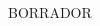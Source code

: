 \begin{titlepage}
    \vspace*{\fill}
    \begin{center}
        {\crest} \\[1.3cm]
        {\Large \gradua}\\[0.3cm]
        {\espezialitatea}\\[1.5cm]

        \HRule \\[0.5cm]
        {
        \LARGE
        \begin{spacing}{0.5}
        \textbf{\izenburua}
        \end{spacing}
        }
        \vspace{0.5cm}
        \HRule \\[0.5cm]

        {\large {\gapizenburua}}\\[2.0cm]

        {\egileatestua\\}
        {\textsl{\egilea}\\}
        \vspace{1.0cm}

        \begin{tcolorbox}
            BORRADOR
        \end{tcolorbox}

        {\large \textsf{\urtea}}
    \end{center}
    \vspace*{\fill}
\end{titlepage}
\restoregeometry %
\cleardoublepage

